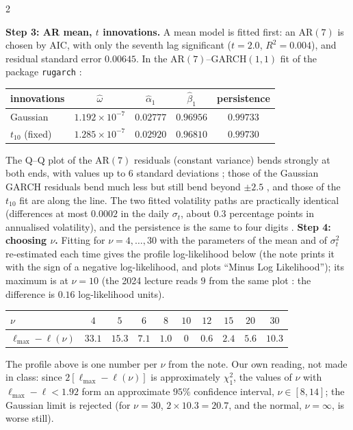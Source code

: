 \begin{paracol}{2}
\begin{secondary}
\textbf{Step 3: AR mean, $t$ innovations.} A mean model is fitted first: an AR$(7)$ is chosen by AIC, with only the seventh lag significant ($t=2.0$, $R^2=0.004$), and residual standard error $0.00645$. In the AR$(7)$--GARCH$(1,1)$ fit of the
package \texttt{rugarch} :
\begin{center}\small
\begin{tabular}{@{}lcccc@{}}
\toprule
innovations & $\hat\omega$ & $\hat\alpha_1$ & $\hat\beta_1$ & persistence\\
\midrule
Gaussian & $1.192\times10^{-7}$ & $0.02777$ & $0.96956$ & $0.99733$\\
$t_{10}$ (fixed) & $1.285\times10^{-7}$ & $0.02920$ & $0.96810$ & $0.99730$\\
\bottomrule
\end{tabular}
\end{center}
The Q--Q plot of the AR$(7)$ residuals (constant variance) bends strongly at both ends, with values up to $6$ standard deviations ; those of the Gaussian GARCH residuals bend much less but still bend beyond $\pm2.5$ , and those of the $t_{10}$ fit are along the line.
The two fitted volatility paths are practically identical (differences at most $0.0002$ in the daily $\sigma_t$, about $0.3$ percentage points in annualised volatility), and the persistence is the same to four digits .
\textbf{Step 4: choosing $\nu$.} Fitting for $\nu=4,\dots,30$ with the parameters of the mean and of $\sigma_t^2$ re-estimated each time gives the profile log-likelihood below (the note prints it with the sign of a negative log-likelihood, and plots ``Minus Log Likelihood'');
its maximum is at $\nu=10$  (the 2024 lecture reads $9$ from the same plot : the difference is $0.16$ log-likelihood units).
\begin{center}\small
\begin{tabular}{@{}lccccccccc@{}}
\toprule
$\nu$ & $4$ & $5$ & $6$ & $8$ & $10$ & $12$ & $15$ & $20$ & $30$\\
\midrule
$\ell_{\max}-\ell(\nu)$ & $33.1$ & $15.3$ & $7.1$ & $1.0$ & $0$ & $0.6$ & $2.4$ & $5.6$ & $10.3$\\
\bottomrule
\end{tabular}
\end{center}
\end{secondary}
\begin{secondary}
The profile above is one number per $\nu$ from the note. Our own reading, not made in class: since $2[\ell_{\max}-\ell(\nu)]$ is approximately $\chi^2_1$, the values of $\nu$ with $\ell_{\max}-\ell<1.92$ form an approximate $95\%$ confidence interval, $\nu\in[8,14]$; the Gaussian
limit is rejected (for $\nu=30$, $2\times10.3=20.7$, and the normal, $\nu=\infty$, is worse still).
\end{secondary}


\end{paracol}

